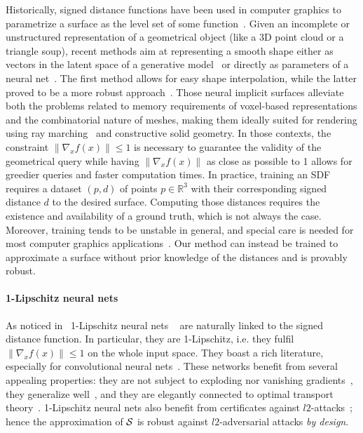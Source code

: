 Historically, signed distance functions have been used in computer graphics to parametrize a surface as the level set of some function~\cite{novelloExploringDifferentialGeometry2022}. Given an incomplete or unstructured representation of a geometrical object (like a 3D point cloud or a triangle soup), recent methods aim at representing a smooth shape either as vectors in the latent space of a generative model~\cite{achlioptasLearningRepresentationsGenerative2018, ben-hamuMultichartGenerativeSurface2018, groueixAtlasNetPapierMAch2018, chouGenSDFTwoStageLearning2022} or directly as parameters of a neural net~\cite{parkDeepSDFLearningContinuous2019, atzmonSALSignAgnostic2020}.
The first method allows for easy shape interpolation, while the latter proved to be a more robust approach~\cite{daviesEffectivenessWeightEncodedNeural2021}. Those neural implicit surfaces alleviate both the problems related to memory requirements of voxel-based representations and the combinatorial nature of meshes, making them ideally suited for rendering using ray marching~\cite{hartSphereTracingGeometric1995} and constructive solid geometry. In those contexts, the constraint $\|\nabla_x f(x)\|\leq 1$ is necessary to guarantee the validity of the geometrical query while having $\|\nabla_x f(x)\|$ as close as possible to 1 allows for greedier queries and faster computation times. In practice, training an SDF requires a dataset $(p,d)$ of points $p \in \mathbb{R}^3$ with their corresponding signed distance $d$ to the desired surface. Computing those distances requires the existence and availability of a ground truth, which is not always the case. Moreover, training tends to be unstable in general, and special care is needed for most computer graphics applications~\cite{sharpSpelunkingDeepGuaranteed2022}. Our method can instead be trained to approximate a surface without prior knowledge of the distances and is provably robust.

\paragraph{1-Lipschitz neural nets}

As noticed in~\cite{bethune2022pay,brau2022robust} 1-Lipschitz neural nets ~\cite{stasiak2006fast,li2019orthogonal,su2021scaling} are naturally linked to the signed distance function. In particular, they are 1-Lipschitz, i.e. they fulfil $\|\nabla_x f(x)\|\leq 1$ on the whole input space. They boast a rich literature, especially for convolutional neural nets~\cite{gayer2020convolutional,wang2020orthogonal,liu2021convolutional,achour2021existence,li2019preventing,trockman2021orthogonalizing,singla2021skew}. These networks benefit from several appealing properties: they are not subject to exploding nor vanishing gradients~\cite{li2019preventing}, they generalize well~\cite{bartlett2019nearly,bethune2022pay}, and they are elegantly connected to optimal transport theory~\cite{arjovsky2017wasserstein,serrurier2021achieving}. 1-Lipschitz neural nets also benefit from certificates against $l2$-attacks~\cite{li2019preventing,NEURIPS2018_48584348}; hence the approximation of $\mathcal{S}$ is robust against $l2$-adversarial attacks \textit{by design}.   


